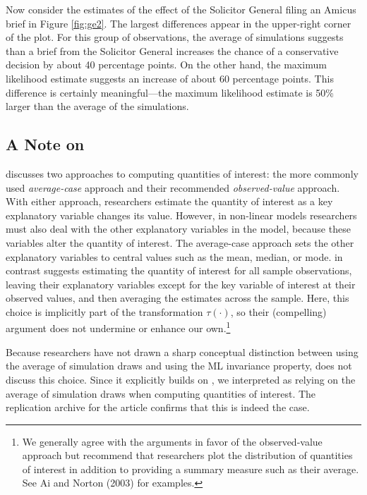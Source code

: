 \documentclass[11pt]{article}
\begin{document}
Now consider the estimates of the effect of the Solicitor General filing an Amicus brief in Figure \ref{fig:ge2}.
The largest differences appear in the upper-right corner of the plot.
For this group of observations, the average of simulations suggests than a brief from the Solicitor General increases the chance of a conservative decision by about 40 percentage points.
On the other hand, the maximum likelihood estimate suggests an increase of about 60 percentage points.
This difference is certainly meaningful---the maximum likelihood estimate is 50\% larger than the average of the simulations.

\subsection*{A Note on \cite{HanmerKalkan2013}}

\cite{HanmerKalkan2013} discusses two approaches to computing quantities of interest: the more commonly used {\it average-case} approach and their recommended {\it observed-value} approach. With either approach, researchers estimate the quantity of interest as a key explanatory variable changes its value. However, in non-linear models researchers must also deal with the other explanatory variables in the model, because these variables alter the quantity of interest. The average-case approach sets the other explanatory variables to central values such as the mean, median, or mode. \cite{HanmerKalkan2013} in contrast suggests estimating the quantity of interest for all sample observations, leaving their explanatory variables except for the key variable of interest at their observed values, and then averaging the estimates across the sample. Here, this choice is implicitly part of the transformation $\tau(\cdot)$, so their (compelling) argument does not undermine or enhance our own.\footnote{We generally agree with the arguments in favor of the observed-value approach but recommend that researchers plot the distribution of quantities of interest in addition to providing a summary measure such as their average. See Ai and Norton (2003) for examples.}

Because researchers have not drawn a sharp conceptual distinction between using the average of simulation draws and using the ML invariance property, \cite{HanmerKalkan2013} does not discuss this choice. Since it explicitly builds on \cite{KingTomzWittenberg2000}, we interpreted \cite{HanmerKalkan2013} as relying on the average of simulation draws when computing quantities of interest. The replication archive for the article confirms that this is indeed the case.
\end{document}
